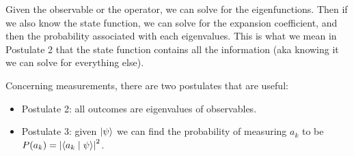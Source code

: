 \documentclass{school-22.101-notes}
\begin{document}
Given the observable or the operator, we can solve for the eigenfunctions. Then if we also know the state function, we can solve for the expansion coefficient, and then the probability associated with each eigenvalues. This is what we mean in Postulate 2 that the state function contains all the information (aka knowing it we can solve for everything else). 





Concerning measurements, there are two postulates that are useful: 
\begin{itemize}
\item Postulate 2: all outcomes are eigenvalues of observables. 
\item Postulate 3: given $\left| \psi \right>$ we can find the probability of measuring $a_k$ to be $P(a_k) = \left| \langle a_k \mid \psi \rangle \right|^2$. 
\end{itemize}
\end{document}
